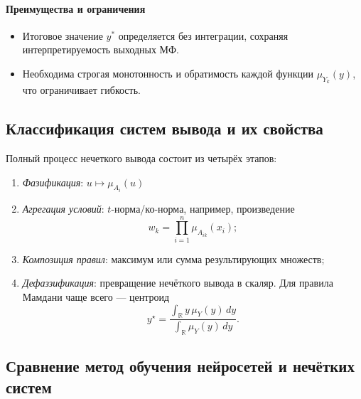 \paragraph{Преимущества и ограничения}
\begin{itemize}
  \item Итоговое значение $y^*$ определяется без интеграции, сохраняя интерпретируемость выходных МФ.
  \item Необходима строгая монотонность и обратимость каждой функции $\mu_{Y_k}(y)$, что ограничивает гибкость.
\end{itemize}



\subsection{Классификация систем вывода и их свойства}
\label{subsec:classification}

Полный процесс нечеткого вывода состоит из четырёх этапов:

\begin{enumerate}
  \item \emph{Фазификация}: $u\mapsto\mu_{A_i}(u)$
  \item \emph{Агрегация условий}: $t$-норма/ко-норма,
        например, произведение
        \begin{equation}
          w_k=\prod_{i=1}^{n}\mu_{A_{ik}}(x_i);
          \label{eq:tprod}
        \end{equation}
  \item \emph{Композиция правил}: максимум или сумма
        результирующих множеств;
  \item \emph{Дефаззификация}: превращение
        нечёткого вывода в скаляр.  
        Для правила Мамдани чаще всего —
        центроид
        \begin{equation}
          y^\star=\frac{\displaystyle
                     \int_{\mathbb R} y\,\mu_Y(y)\,dy}
                     {\displaystyle\int_{\mathbb R}\mu_Y(y)\,dy}.
          \label{eq:centroid}
        \end{equation}
\end{enumerate}

\subsection{Сравнение метод обучения нейросетей и нечётких систем}
\label{subsec:training_methods}

